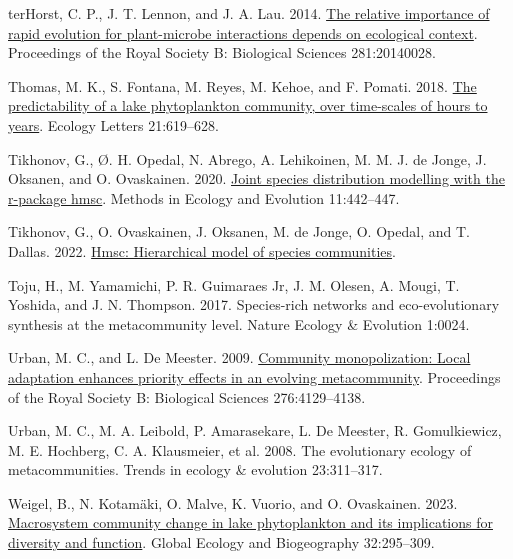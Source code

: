\documentclass[
]{article}
\newlength{\cslhangindent}
\newlength{\cslentryspacingunit} %
\newenvironment{CSLReferences}[2] %
 {%
  \setlength{\parindent}{0pt}
  \ifodd #1
  \let\oldpar\par
  \def\par{\hangindent=\cslhangindent\oldpar}
  \fi
  \setlength{\parskip}{#2\cslentryspacingunit}
 }%
 {}
\begin{document}
\begin{CSLReferences}{0}{0}
\leavevmode{}%
terHorst, C. P., J. T. Lennon, and J. A. Lau. 2014. \href{https://doi.org/10.1098/rspb.2014.0028}{The relative importance of rapid evolution for plant-microbe interactions depends on ecological context}. Proceedings of the Royal Society B: Biological Sciences 281:20140028.

\leavevmode{}%
Thomas, M. K., S. Fontana, M. Reyes, M. Kehoe, and F. Pomati. 2018. \href{https://doi.org/10.1111/ele.12927}{The predictability of a lake phytoplankton community, over time-scales of hours to years}. Ecology Letters 21:619--628.

\leavevmode{}%
Tikhonov, G., Ø. H. Opedal, N. Abrego, A. Lehikoinen, M. M. J. de Jonge, J. Oksanen, and O. Ovaskainen. 2020. \href{https://doi.org/10.1111/2041-210X.13345}{Joint species distribution modelling with the r-package hmsc}. Methods in Ecology and Evolution 11:442--447.

\leavevmode{}%
Tikhonov, G., O. Ovaskainen, J. Oksanen, M. de Jonge, O. Opedal, and T. Dallas. 2022. \href{https://CRAN.R-project.org/package=Hmsc}{Hmsc: Hierarchical model of species communities}.

\leavevmode{}%
Toju, H., M. Yamamichi, P. R. Guimaraes Jr, J. M. Olesen, A. Mougi, T. Yoshida, and J. N. Thompson. 2017. Species-rich networks and eco-evolutionary synthesis at the metacommunity level. Nature Ecology \& Evolution 1:0024.

\leavevmode{}%
Urban, M. C., and L. De Meester. 2009. \href{https://doi.org/10.1098/rspb.2009.1382}{Community monopolization: Local adaptation enhances priority effects in an evolving metacommunity}. Proceedings of the Royal Society B: Biological Sciences 276:4129--4138.

\leavevmode{}%
Urban, M. C., M. A. Leibold, P. Amarasekare, L. De Meester, R. Gomulkiewicz, M. E. Hochberg, C. A. Klausmeier, et al. 2008. The evolutionary ecology of metacommunities. Trends in ecology \& evolution 23:311--317.

\leavevmode{}%
Weigel, B., N. Kotamäki, O. Malve, K. Vuorio, and O. Ovaskainen. 2023. \href{https://doi.org/10.1111/geb.13626}{Macrosystem community change in lake phytoplankton and its implications for diversity and function}. Global Ecology and Biogeography 32:295--309.

\end{CSLReferences}
\end{document}
